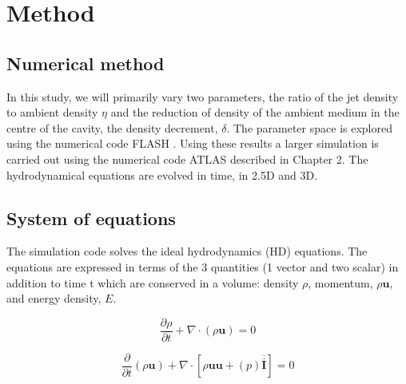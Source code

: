 

\section{Method}
\subsection{Numerical method}
In this study, we will primarily vary two parameters, the ratio of the jet density to ambient density 
$\eta$ and the reduction of density of the ambient medium in the centre of the cavity, the density decrement, $\delta$.
The parameter space is explored using the numerical code FLASH \citep{2002ApJS..143..201C}.
Using these results a larger simulation is carried out using the numerical code ATLAS described in Chapter 2.
The hydrodynamical equations are evolved in time, in 2.5D and 3D.



\subsection{System of equations}

The simulation code solves the ideal hydrodynamics (HD) equations.
The equations are expressed in terms of the 3 quantities (1 vector and two scalar) in addition to time t which are conserved in a volume:
density $\rho$, momentum, $\rho \mathbf u$, and energy density, $E$.


\begin{equation}
\frac{\partial \rho}{\partial t}+\nabla\cdot(\rho \mathbf u)=0
\end{equation}

\begin{equation}
\frac{\partial}{\partial t}\left(
\rho \mathbf u
\right)
+\nabla
\cdot
\left[
\rho \mathbf u \mathbf u
+\left(
p
\right)
\mathbf {{\overline {\overline I}}}
\right]
=0
\end{equation}



